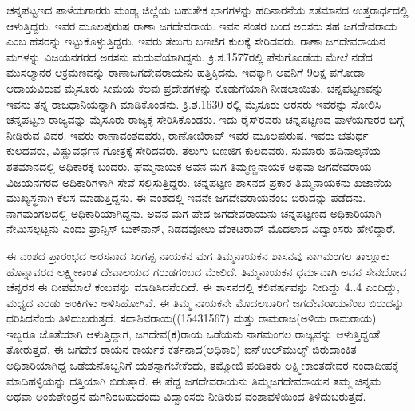 ಚನ್ನಪಟ್ಟಣದ ಪಾಳೆಯಗಾರರು ಮಂಡ್ಯ ಜಿಲ್ಲೆಯ ಬಹುತೇಕ ಭಾಗಗಳನ್ನು ಹದಿನಾರನೆಯ ಶತಮಾನದ ಉತ್ತರಾರ್ಧದಲ್ಲಿ ಆಳುತ್ತಿದ್ದರು. ಇವರ ಮೂಲಪುರುಷ ರಾಣಾ ಜಗದೇವರಾಯ. ಇವನ ನಂತರ ಬಂದ ಅರಸರು ಸಹ ಜಗದೇವರಾಯ ಎಂಬ ಹೆಸರನ್ನು ಇಟ್ಟುಕೊಳ್ಳುತ್ತಿದ್ದರು. ಇವರು ತೆಲುಗು ಬಣಜಿಗ ಕುಲಕ್ಕೆ ಸೇರಿದವರು. ರಾಣಾ ಜಗದೇವರಾಯನ ಮಗಳನ್ನು ವಿಜಯನಗರದ ಅರಸನು ಮದುವೆಯಾಗಿದ್ದನು. ಕ್ರಿ.ಶ.1577ರಲ್ಲಿ ಪೆನುಗೊಂಡೆಯ ಮೇಲೆ ನಡೆದ ಮುಸಲ್ಮಾನರ ಆಕ್ರಮಣವನ್ನು ರಾಣಾಜಗದೇವರಾಯನು ಹತ್ತಿಕ್ಕಿದನು. ಇದಕ್ಕಾಗಿ ಅವನಿಗೆ 9ಲಕ್ಷ ಪಗೋಡಾ ಆದಾಯವಿರುವ ಮೈಸೂರು ಸೀಮೆಯ ಕೆಲವು ಪ್ರದೇಶಗಳನ್ನು ಕೊಡುಗೆಯಾಗಿ ನೀಡಲಾಯಿತು. ಚನ್ನಪಟ್ಟಣವನ್ನು ಇವನು ತನ್ನ ರಾಜಧಾನಿಯನ್ನಾಗಿ ಮಾಡಿಕೊಂಡನು. ಕ್ರಿ.ಶ.1630 ರಲ್ಲಿ ಮೈಸೂರು ಅರಸರು ಇವರನ್ನು ಸೋಲಿಸಿ ಚನ್ನಪಟ್ಟಣ ರಾಜ್ಯವನ್ನು ಮೈಸೂರು ರಾಜ್ಯಕ್ಕೆ ಸೇರಿಸಿಕೊಂಡರು. ಇದು ರೈಸ್​ರವರು ಚನ್ನಪಟ್ಟಣದ ಪಾಳೆಯಗಾರರ ಬಗ್ಗೆ ನೀಡಿರುವ ವಿವರ. ಇವರು ರಾಣಾವಂಶದವರು, ರಾಣೋಜಿರಾವ್​ ಇವರ ಮೂಲಪುರುಷ. ಇವರು ಚತುರ್ಥ ಕುಲದವರು, ವಿಷ್ಣುವರ್ಧನ ಗೋತ್ರಕ್ಕೆ ಸೇರಿದವರು. ತೆಲುಗು ಬಣಜಿಗ ಕುಲದವರು. ಸುಮಾರು ಹದಿನಾಲ್ಕನೆಯ ಶತಮಾನದಲ್ಲಿ ಅಧಿಕಾರಕ್ಕೆ ಬಂದರು. ಘಮ್ಮನಾಯಕ ಅವನ ಮಗ ತಿಮ್ಮಣ್ಣನಾಯಕ ಅಥವಾ ಜಗದೇವರಾಯ ವಿಜಯನಗರದ ಅಧಿಕಾರಿಗಳಾಗಿ ಸೇವೆ ಸಲ್ಲಿಸುತ್ತಿದ್ದರು. ಚನ್ನಪಟ್ಟಣ ಶಾಸನದ ಪ್ರಕಾರ ತಿಮ್ಮನಾಯಕನು ಖಜಾನೆಯ ಮುಖ್ಯಸ್ಥನಾಗಿ ಕೆಲಸ ಮಾಡುತ್ತಿದ್ದನು. ಈ ವಂಶದಲ್ಲಿ ಇವನೇ ಜಗದೇವರಾಯನೆಂಬ ಬಿರುದನ್ನು ಪಡೆದನು. ನಾಗಮಂಗಲದಲ್ಲಿ ಅಧಿಕಾರಿಯಾಗಿದ್ದನು. ಅವನ ಮಗ ಪೇದ ಜಗದೇವರಾಯನು ಚನ್ನಪಟ್ಟಣದ ಅಧಿಕಾರಿಯಾಗಿ ನೇಮಿಸಲ್ಪಟ್ಟನು ಎಂದು ಫ್ರಾನ್ಸಿಸ್​ ಬುಕ್​ನಾನ್​, ನಿಡದವೋಲು ವೆಂಕಟರಾವ್​ ಮೊದಲಾದ ವಿದ್ವಾಂಸರು ಹೇಳಿದ್ದಾರೆ.

ಈ ವಂಶದ ಪ್ರಾರಂಭದ ಅರಸನಾದ ಸಿಂಗಪ್ಪ ನಾಯಕನ ಮಗ ತಿಮ್ಮನಾಯಕನ ಶಾಸನವು ನಾಗಮಂಗಲ ತಾಲ್ಲೂಕು ಹೊನ್ನಾವರದ ಲಕ್ಷ್ಮೀಕಾಂತ ದೇವಾಲಯದ ಗರುಡಗಂಬದ ಮೇಲಿದೆ. ತಿಮ್ಮನಾಯಕನ ಧರ್ಮವಾಗಿ ಅವನ ಸೇನಬೋವ ಚೆನ್ನರಸ ಈ ದೀಪಮಾಲೆ ಕಂಬವನ್ನು ಮಾಡಿಸಿದನೆಂದಿದೆ. ಈ ಶಾಸನದಲ್ಲಿ ಕಲಿವರ್ಷವನ್ನು ನೀಡಿದ್ದು 4..4 ಎಂದಿದ್ದು, ಮಧ್ಯದ ಎರಡು ಅಂಕಿಗಳು ಅಳಿಸಿಹೋಗಿವೆ. ಈ ತಿಮ್ಮ ನಾಯಕನೇ ಮೊದಲಬಾರಿಗೆ ಜಗದೇವರಾಯನೆಂಬ ಬಿರುದನ್ನು ಧರಿಸಿದನೆಂದು ತಿಳಿದುಬರುತ್ತದೆ. ಸದಾಶಿವರಾಯ((1543\enginline{-}1567) ಮತ್ತು ರಾಮರಾಜ(ಅಳಿಯ ರಾಮರಾಯ) ಇಬ್ಬರೂ ಜೊತೆಯಾಗಿ ಆಳುತ್ತಿದ್ದಾಗ, ಜಗದೇವ(ಕ)ರಾಯ ಒಡೆಯನು ನಾಗಮಂಗಲ ರಾಜ್ಯವನ್ನು ಆಳುತ್ತಿದ್ದಂತೆ ತೋರುತ್ತದೆ. ಈ ಜಗದೇಕ ರಾಯನ ಕಾರ್ಯಕೆ ಕರ್ತನಾದ(ಅಧಿಕಾರಿ) ಐನ್​\enginline{-}ಉಲ್​\enginline{-}ಮುಲ್ಕ್​ ಬಿರುದಾಂಕಿತ ಅಧಿಕಾರಿಯಾಗಿದ್ದ ಒಡೆಯನೊಬ್ಬನಿಗೆ ಯಶಸ್ಸಾಗಬೇಕೆಂದು, ತಮ್ಮೋಜಿ ಪಂಡಿತರು ಲಕ್ಷ್ಮೀಕಾಂತದೇವರ ನಂದಾದೀಪಕ್ಕೆ ಮಾದಿಹಳ್ಳಿಯನ್ನು ದತ್ತಿಯಾಗಿ ಬಿಡುತ್ತಾರೆ. ಈ ಪೆದ್ದ ಜಗದೇವರಾಯನು ತಿಮ್ಮಜಗದೇವರಾಯನ ತಮ್ಮ ಚಿನ್ನಮ ಅಥವಾ ಅಂಕುಶೇಂದ್ರನ ಮಗನಿರಬಹುದೆಂದು ವಿದ್ವಾಂಸರು ನೀಡಿರುವ ವಂಶಾವಳಿಯಿಂದ ತಿಳಿದುಬರುತ್ತದೆ.

